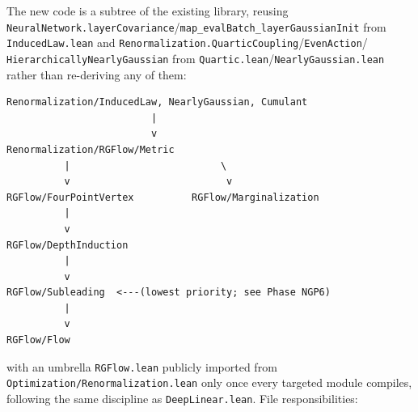 The new code is a subtree of the existing library, reusing
\texttt{NeuralNetwork.layerCovariance}/\texttt{map\_evalBatch\_layerGaussianInit} from
\texttt{InducedLaw.lean} and \texttt{Renormalization.QuarticCoupling}/\texttt{EvenAction}/
\texttt{HierarchicallyNearlyGaussian} from \texttt{Quartic.lean}/\texttt{NearlyGaussian.lean}
rather than re-deriving any of them:
\begin{verbatim}
Renormalization/InducedLaw, NearlyGaussian, Cumulant
                         |
                         v
Renormalization/RGFlow/Metric
          |                          \
          v                           v
RGFlow/FourPointVertex          RGFlow/Marginalization
          |
          v
RGFlow/DepthInduction
          |
          v
RGFlow/Subleading  <---(lowest priority; see Phase NGP6)
          |
          v
RGFlow/Flow
\end{verbatim}
with an umbrella \texttt{RGFlow.lean} publicly imported from
\texttt{Optimization/Renormalization.lean} only once every targeted module compiles, following the
same discipline as \texttt{DeepLinear.lean}. File responsibilities:
